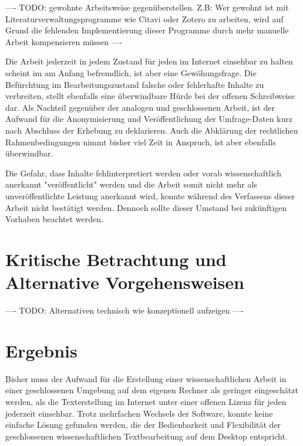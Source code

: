 ---- TODO: gewohnte Arbeitsweise gegenüberstellen. Z.B: Wer gewohnt ist mit Literaturverwaltungsprogramme wie Citavi oder Zotero zu arbeiten, wird auf Grund die fehlenden Implementierung dieser Programme  durch mehr manuelle Arbeit kompensieren müssen ----

Die Arbeit jederzeit in jedem Zustand für jeden im Internet einsehbar zu halten scheint im am Anfang befremdlich, ist aber eine Gewöhungsfrage. Die Befürchtung im Bearbeitungszustand falsche oder fehlerhafte Inhalte zu verbreiten, stellt ebenfalls eine überwindbare Hürde bei der offenen Schreibweise dar. Als Nachteil gegenüber der analogen und geschlossenen Arbeit, ist der Aufwand für die Anonymisierung und Veröffentlichung der Umfrage-Daten kurz nach Abschluss der Erhebung zu deklarieren. Auch die Abklärung der rechtlichen Rahmenbedingungen nimmt bisher viel Zeit in Anspruch, ist aber ebenfalls überwindbar.

Die Gefahr, dass Inhalte fehlinterpretiert werden oder vorab wissenschaftlich anerkannt "veröffentlicht" werden und die Arbeit somit nicht mehr als unveröffentlichte Leistung anerkannt wird, konnte während des Verfassens dieser Arbeit nicht bestätigt werden. Dennoch sollte dieser Umstand bei zukünftigen Vorhaben beachtet werden.

\section{Kritische Betrachtung und Alternative Vorgehensweisen}

---- TODO: Alternativen technisch wie konzeptionell aufzeigen ----

\section{Ergebnis}

Bisher muss der Aufwand für die Erstellung einer wissenschaftlichen Arbeit in einer geschlossenen Umgebung auf dem eigenen Rechner als geringer eingeschätzt werden, als die Texterstellung im Internet unter einer offenen Lizenz für jeden jederzeit einsehbar. Trotz mehrfachen Wechsels der Software, konnte keine einfache Lösung gefunden werden, die der Bedienbarkeit und Flexibilität der geschlossenen wissenschaftlichen Textbearbeitung auf dem Desktop entspricht.

